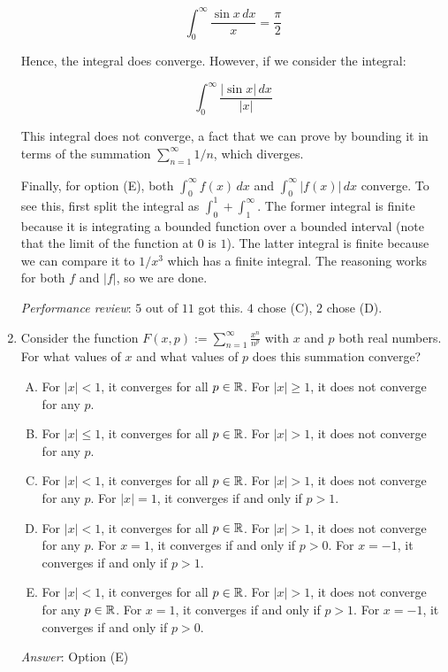 \documentclass[10pt]{amsart}
\begin{document}
\begin{enumerate}
  $$\int_0^\infty \frac{\sin x \, dx}{x} = \frac{\pi}{2}$$

  Hence, the integral does converge. However, if we consider the integral:

  $$\int_0^\infty \frac{|\sin x| \, dx}{|x|}$$

  This integral does not converge, a fact that we can prove by
  bounding it in terms of the summation $\sum_{n=1}^\infty 1/n$, which
  diverges.

  Finally, for option (E), both $\int_0^\infty f(x) \, dx$ and
  $\int_0^\infty |f(x)| \, dx$ converge. To see this, first split the
  integral as $\int_0^1 + \int_1^\infty$. The former integral is
  finite because it is integrating a bounded function over a bounded
  interval (note that the limit of the function at $0$ is $1$). The
  latter integral is finite because we can compare it to $1/x^3$ which
  has a finite integral. The reasoning works for both $f$ and $|f|$,
  so we are done.

  {\em Performance review}: $5$ out of $11$ got this. $4$ chose (C),
  $2$ chose (D).

\item Consider the function $F(x,p) := \sum_{n=1}^\infty
  \frac{x^n}{n^p}$ with $x$ and $p$ both real numbers. For what values
  of $x$ and what values of $p$ does this summation converge?
  \begin{enumerate}[(A)]
  \item For $|x| < 1$, it converges for all $p \in \mathbb{R}$. For $|x| \ge
    1$, it does not converge for any $p$.
  \item For $|x| \le 1$, it converges for all $p \in \mathbb{R}$. For $|x| >
    1$, it does not converge for any $p$.
  \item For $|x| < 1$, it converges for all $p \in \mathbb{R}$. For $|x| > 1$,
    it does not converge for any $p$. For $|x| = 1$, it converges if
    and only if $p > 1$.
  \item For $|x| < 1$, it converges for all $p \in \mathbb{R}$. For $|x| > 1$,
    it does not converge for any $p$. For $x = 1$, it converges
    if and only if $p > 0$. For $x = -1$, it converges if and only if
    $p > 1$.
  \item For $|x| < 1$, it converges for all $p \in \mathbb{R}$. For $|x| > 1$,
    it does not converge for any $p \in \mathbb{R}$. For $x = 1$, it converges
    if and only if $p > 1$. For $x = -1$, it converges if and only if
    $p > 0$.
  \end{enumerate}

  {\em Answer}: Option (E)


\end{enumerate}
\end{document}
